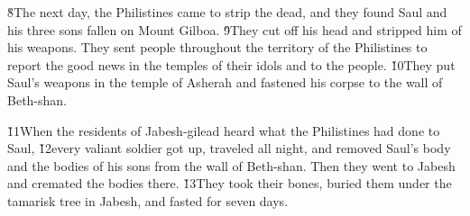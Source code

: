 \v{8}The next day, the Philistines came to strip the dead, and they found Saul and his three sons fallen on Mount Gilboa. \v{9}They cut off his head and stripped him of his weapons. They sent people throughout the territory of the Philistines to report the good news in the temples of their idols and to the people. \v{10}They put Saul's weapons in the temple of Asherah and fastened his corpse to the wall of Beth-shan.

\v{11}When the residents of Jabesh-gilead heard what the Philistines had done to Saul, \v{12}every valiant soldier got up, traveled all night, and removed Saul's body and the bodies of his sons from the wall of Beth-shan. Then they went to Jabesh and cremated the bodies there. \v{13}They took their bones, buried them under the tamarisk tree in Jabesh, and fasted for seven days.
